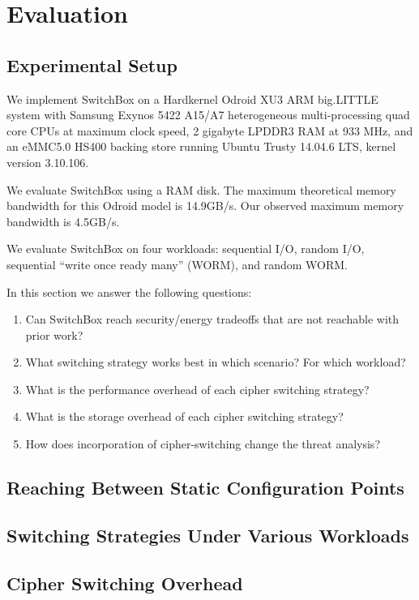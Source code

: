 \section{Evaluation}\label{sec:evaluation}

\subsection{Experimental Setup}

We implement SwitchBox on a Hardkernel Odroid XU3 ARM big.LITTLE system with
Samsung Exynos 5422 A15/A7 heterogeneous multi-processing quad core CPUs at
maximum clock speed, 2 gigabyte LPDDR3 RAM at 933 MHz, and an eMMC5.0 HS400
backing store running Ubuntu Trusty 14.04.6 LTS, kernel version 3.10.106.

We evaluate SwitchBox using a RAM disk. The maximum theoretical memory bandwidth
for this Odroid model is 14.9GB/s\@. Our observed maximum memory bandwidth is
4.5GB/s.

We evaluate SwitchBox on four workloads: sequential I/O, random I/O, sequential
``write once ready many'' (WORM), and random WORM.

In this section we answer the following questions:
\begin{enumerate}
 \item Can SwitchBox reach security/energy tradeoffs that are not reachable with prior work?
 \item What switching strategy works best in which scenario? For which workload?
 \item What is the performance overhead of each cipher switching strategy?
 \item What is the storage overhead of each cipher switching strategy?
 \item How does incorporation of cipher-switching change the threat analysis?
\end{enumerate}

\subsection{Reaching Between Static Configuration Points}

\subsection{Switching Strategies Under Various Workloads}

\subsection{Cipher Switching Overhead}

